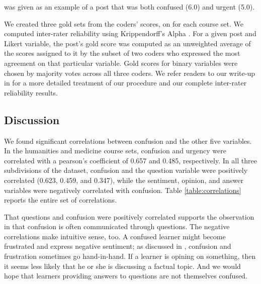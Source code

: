 \documentclass{edm_template}
\begin{document}
was given as an example of a post that was both confused (6.0) and urgent (5.0).

We created three gold sets from the coders' scores, on for each course set. We computed inter-rater reliability using Krippendorff's Alpha \cite{hayes2007answering}. For a given post and Likert variable, the post's gold score was computed as an unweighted average of the scores assigned to it by the subset of two coders who expressed the most agreement on that particular variable. Gold scores for binary variables were chosen by majority votes across all three coders. We refer readers to our write-up in \cite{stanfordMOOCPosts} for a more detailed treatment of our procedure and our complete inter-rater reliability results.


\subsection{Discussion}
We found significant correlations between confusion and the other five variables. In the humanities and medicine course sets, confusion and urgency were correlated with a pearson's coefficient of 0.657 and 0.485, respectively. In all three subdivisions of the dataset, confusion and the question variable were positively correlated (0.623, 0.459, and 0.347), while the sentiment, opinion, and answer variables were negatively correlated with confusion. Table \ref{table:correlations} reports the entire set of correlations.

That questions and confusion were positively correlated supports the observation in \cite{wilson1989learning} that confusion is often communicated through questions. The negative correlations make intuitive sense, too. A confused learner might become frustrated and express negative sentiment; as discussed in \cite{liu2013sequences}, confusion and frustration sometimes go hand-in-hand. If a learner is opining on something, then it seems less likely that he or she is discussing a factual topic. And we would hope that learners providing answers to questions are not themselves confused.
\end{document}
